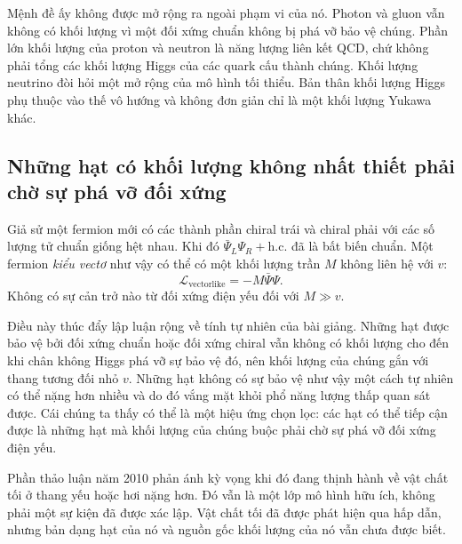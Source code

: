 Mệnh đề ấy không được mở rộng ra ngoài phạm vi của nó. Photon và gluon vẫn không có khối lượng vì một đối xứng chuẩn không bị phá vỡ bảo vệ chúng. Phần lớn khối lượng của proton và neutron là năng lượng liên kết QCD, chứ không phải tổng các khối lượng Higgs của các quark cấu thành chúng. Khối lượng neutrino đòi hỏi một mở rộng của mô hình tối thiểu. Bản thân khối lượng Higgs phụ thuộc vào thế vô hướng và không đơn giản chỉ là một khối lượng Yukawa khác.

\subsection{Những hạt có khối lượng không nhất thiết phải chờ sự phá vỡ đối xứng}

Giả sử một fermion mới có các thành phần chiral trái và chiral phải với các số lượng tử chuẩn giống hệt nhau. Khi đó \(\bar\Psi_L\Psi_R+\mathrm{h.c.}\) đã là bất biến chuẩn. Một fermion \emph{kiểu vectơ} như vậy có thể có một khối lượng trần \(M\) không liên hệ với \(v\):
\begin{equation}
  \mathcal L_{\mathrm{vectorlike}}
  =-M\bar\Psi\Psi.
  \label{eq:l09-vectorlike-mass}
\end{equation}
Không có sự cản trở nào từ đối xứng điện yếu đối với \(M\gg v\).

Điều này thúc đẩy lập luận rộng về tính tự nhiên của bài giảng. Những hạt được bảo vệ bởi đối xứng chuẩn hoặc đối xứng chiral vẫn không có khối lượng cho đến khi chân không Higgs phá vỡ sự bảo vệ đó, nên khối lượng của chúng gắn với thang tương đối nhỏ \(v\). Những hạt không có sự bảo vệ như vậy một cách tự nhiên có thể nặng hơn nhiều và do đó vắng mặt khỏi phổ năng lượng thấp quan sát được. Cái chúng ta thấy có thể là một hiệu ứng chọn lọc: các hạt có thể tiếp cận được là những hạt mà khối lượng của chúng buộc phải chờ sự phá vỡ đối xứng điện yếu.

\begin{classroomqa}
\end{classroomqa}

Phần thảo luận năm 2010 phản ánh kỳ vọng khi đó đang thịnh hành về vật chất tối ở thang yếu hoặc hơi nặng hơn. Đó vẫn là một lớp mô hình hữu ích, không phải một sự kiện đã được xác lập. Vật chất tối đã được phát hiện qua hấp dẫn, nhưng bản dạng hạt của nó và nguồn gốc khối lượng của nó vẫn chưa được biết.

